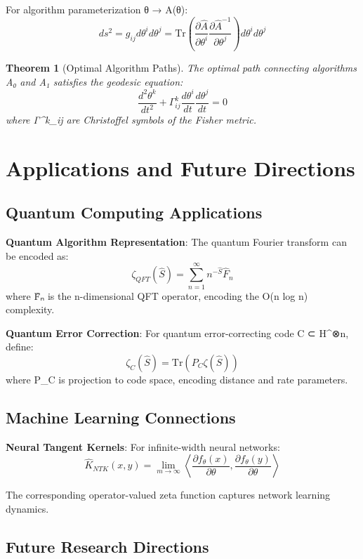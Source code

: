 \documentclass[12pt]{article}
\theoremstyle{plain}
\newtheorem{theorem}{Theorem}[section]
\theoremstyle{definition}
\begin{document}
For algorithm parameterization θ → A(θ):
$$ds^2 = g_{ij} d\theta^i d\theta^j = \text{Tr}\left(\frac{\partial \hat{A}}{\partial \theta^i} \frac{\partial \hat{A}^{-1}}{\partial \theta^j}\right) d\theta^i d\theta^j$$

\begin{theorem}[Optimal Algorithm Paths]
The optimal path connecting algorithms A₀ and A₁ satisfies the geodesic equation:
$$\frac{d^2 \theta^k}{dt^2} + \Gamma^k_{ij} \frac{d\theta^i}{dt} \frac{d\theta^j}{dt} = 0$$
where Γ^k_{ij} are Christoffel symbols of the Fisher metric.
\end{theorem}

\section{Applications and Future Directions}

\subsection{Quantum Computing Applications}

\textbf{Quantum Algorithm Representation}: The quantum Fourier transform can be encoded as:
$$\zeta_{QFT}(\hat{S}) = \sum_{n=1}^{\infty} n^{-\hat{S}} \hat{F}_n$$
where F̂ₙ is the n-dimensional QFT operator, encoding the O(n log n) complexity.

\textbf{Quantum Error Correction}: For quantum error-correcting code C ⊂ H^⊗n, define:
$$\zeta_C(\hat{S}) = \text{Tr}(P_C \zeta(\hat{S}))$$
where P_C is projection to code space, encoding distance and rate parameters.

\subsection{Machine Learning Connections}

\textbf{Neural Tangent Kernels}: For infinite-width neural networks:
$$\hat{K}_{NTK}(x, y) = \lim_{m \to \infty} \left\langle \frac{\partial f_\theta(x)}{\partial \theta}, \frac{\partial f_\theta(y)}{\partial \theta} \right\rangle$$

The corresponding operator-valued zeta function captures network learning dynamics.

\subsection{Future Research Directions}
\end{document}
